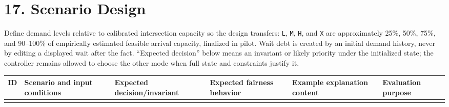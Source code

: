 \documentclass[
  english,
  11pt,
  a4paper,
]{article}
\newcounter{none} %
\begin{document}
\section{17. Scenario Design}\label{scenario-design}

Define demand levels relative to calibrated intersection capacity so the
design transfers: \texttt{L}, \texttt{M}, \texttt{H}, and \texttt{X} are
approximately 25\%, 50\%, 75\%, and 90--100\% of empirically estimated
feasible arrival capacity, finalized in pilot. Wait debt is created by
an initial demand history, never by editing a displayed wait after the
fact. ``Expected decision'' below means an invariant or likely priority
under the initialized state; the controller remains allowed to choose
the other mode when full state and constraints justify it.

\begin{landscape}
{\def\LTcaptype{none} %
\footnotesize
\setlength{\tabcolsep}{4pt}
\begin{longtable}[]{@{}
  >{\raggedright\arraybackslash}p{}
  >{\raggedright\arraybackslash}p{}
  >{\raggedright\arraybackslash}p{}
  >{\raggedright\arraybackslash}p{}
  >{\raggedright\arraybackslash}p{}
  >{\raggedright\arraybackslash}p{}@{}}
\toprule\noalign{}
\begin{minipage}[b]{\linewidth}\raggedright
ID
\end{minipage} & \begin{minipage}[b]{\linewidth}\raggedright
Scenario and input conditions
\end{minipage} & \begin{minipage}[b]{\linewidth}\raggedright
Expected decision/invariant
\end{minipage} & \begin{minipage}[b]{\linewidth}\raggedright
Expected fairness behavior
\end{minipage} & \begin{minipage}[b]{\linewidth}\raggedright
Example explanation content
\end{minipage} & \begin{minipage}[b]{\linewidth}\raggedright
Evaluation purpose
\end{minipage} \\
\midrule\noalign{}

\end{longtable}}
\end{landscape}
\end{document}
